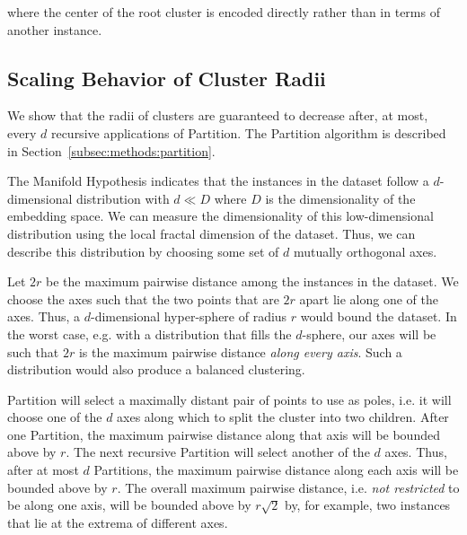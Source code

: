 where the center of the root cluster is encoded directly rather than in terms of another instance.


\subsection{Scaling Behavior of Cluster Radii}
\label{subsec:methods:radii-scaling-behavior}

We show that the radii of clusters are guaranteed to decrease after, at most, every $d$ recursive applications of Partition.
The Partition algorithm is described in Section~\ref{subsec:methods:partition}.

The Manifold Hypothesis indicates that the instances in the dataset follow a $d$-dimensional distribution with $d \ll D$ where $D$ is the dimensionality of the embedding space.
We can measure the dimensionality of this low-dimensional distribution using the local fractal dimension of the dataset.
Thus, we can describe this distribution by choosing some set of $d$ mutually orthogonal axes.

Let $2r$ be the maximum pairwise distance among the instances in the dataset.
We choose the axes such that the two points that are $2r$ apart lie along one of the axes.
Thus, a $d$-dimensional hyper-sphere of radius $r$ would bound the dataset.
In the worst case, e.g. with a distribution that fills the $d$-sphere, our axes will be such that $2r$ is the maximum pairwise distance \textit{along every axis}.
Such a distribution would also produce a balanced clustering.

Partition will select a maximally distant pair of points to use as poles, i.e. it will choose one of the $d$ axes along which to split the cluster into two children.
After one Partition, the maximum pairwise distance along that axis will be bounded above by $r$.
The next recursive Partition will select another of the $d$ axes.
Thus, after at most $d$ Partitions, the maximum pairwise distance along each axis will be bounded above by $r$.
The overall maximum pairwise distance, i.e. \textit{not restricted} to be along one axis, will be bounded above by $r \sqrt{2}$ by, for example, two instances that lie at the extrema of different axes.


